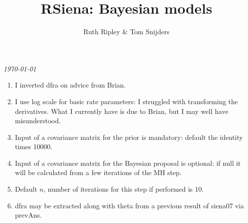 \documentclass[12pt,a4paper]{article}
\renewcommand{\=}{\,=\,}
\newcommand{\+}{\,+\,}
\begin{document}
\title{RSiena: Bayesian models}
\author{Ruth Ripley \& Tom Snijders}
\date{}
\maketitle

\centerline{\emph{\today}}
\bigskip
\begin{enumerate}
\item I inverted dfra on advice from Brian.
\item I use log scale for basic rate parameters: I struggled with transforming
  the derivatives. What I currently have is due to Brian, but I may well have
  misunderstood.
\item Input of a covariance matrix for the prior is mandatory: default the
  identity times 10000.
\item Input of a covariance matrix for the Bayesian proposal is optional: if
  null it will be calculated from a few iterations of the MH step.
\item Default $n$, number of iterations for this step if performed is 10.
\item dfra may be extracted along with theta from a previous result of siena07
via prevAns.
\end{enumerate}
\end{document}
